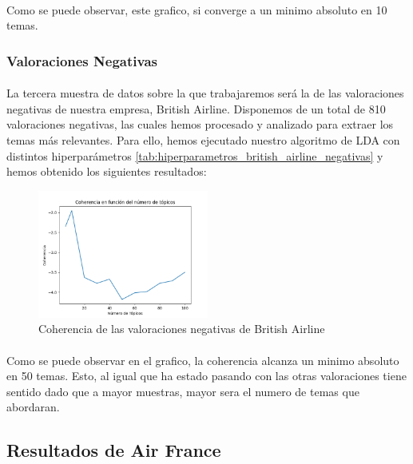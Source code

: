 \documentclass{report}
\begin{document}
                    \paragraph*{}{
                        Como se puede observar, este grafico, si converge a un minimo absoluto en 10 temas.
                    }
                \clearpage\subsubsection*{Valoraciones Negativas}
                    \paragraph*{}{
                        La tercera muestra de datos sobre la que trabajaremos será la de las valoraciones negativas de nuestra empresa, British Airline.
                        Disponemos de un total de 810 valoraciones negativas, las cuales hemos procesado y analizado para extraer los temas más relevantes.
                        Para ello, hemos ejecutado nuestro algoritmo de LDA con distintos hiperparámetros \ref{tab:hiperparametros_british_airline_negativas} y hemos obtenido los siguientes resultados:
                    }
                    \begin{figure}[H]
                        \centering
                        \includegraphics[width=0.5\textwidth]{./img/british_airline_negativas.png}
                        \caption{Coherencia de las valoraciones negativas de British Airline}
                    \end{figure}
                    \paragraph*{}{
                        Como se puede observar en el grafico, la coherencia alcanza un minimo absoluto en 50 temas.
                        Esto, al igual que ha estado pasando con las otras valoraciones tiene sentido dado que a mayor muestras, mayor sera el numero de temas que abordaran.
                    }
            \clearpage\subsection{Resultados de Air France}
\end{document}
